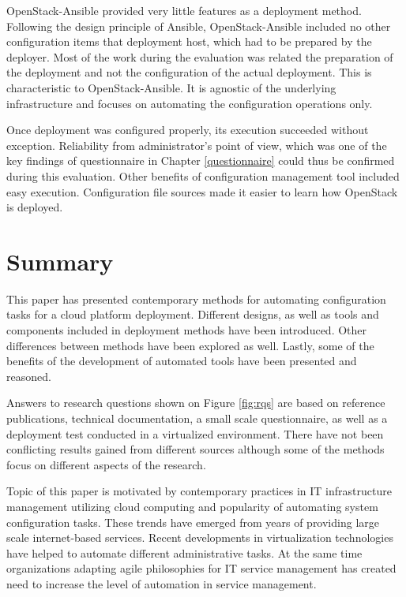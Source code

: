 \documentclass[officiallayout]{tktla}
\begin{document}
OpenStack-Ansible provided very little features as a deployment method.
Following the design principle of Ansible, OpenStack-Ansible included no other
configuration items that deployment host, which had to be prepared by the
deployer. Most of the work during the evaluation was related the preparation of
the deployment and not the configuration of the actual deployment. This is
characteristic to OpenStack-Ansible. It is agnostic of the underlying
infrastructure and focuses on automating the configuration operations only.

Once deployment was configured properly, its execution succeeded without
exception. Reliability from administrator's point of view, which was one of the
key findings of questionnaire in Chapter \ref{questionnaire} could thus be
confirmed during this evaluation. Other benefits of configuration management
tool included easy execution. Configuration file sources made it easier to
learn how OpenStack is deployed.

\chapter{Summary}

This paper has presented contemporary methods for automating configuration
tasks for a cloud platform deployment. Different designs, as well as tools and
components included in deployment methods have been introduced. Other
differences between methods have been explored as well. Lastly, some of the
benefits of the development of automated tools have been presented and
reasoned.

Answers to research questions shown on Figure \ref{fig:rqs} are based on
reference publications, technical documentation, a small scale questionnaire,
as well as a deployment test conducted in a virtualized environment. There have
not been conflicting results gained from different sources although some of the
methods focus on different aspects of the research.

Topic of this paper is motivated by contemporary practices in IT infrastructure
management utilizing cloud computing and popularity of automating system
configuration tasks. These trends have emerged from years of providing
large scale internet-based services. Recent developments in virtualization
technologies have helped to automate different administrative tasks. At the
same time organizations adapting agile philosophies for IT service management
has created need to increase the level of automation in service management.
\end{document}
